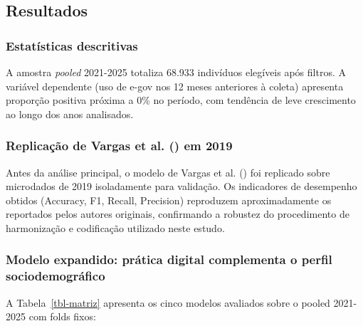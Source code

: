 \documentclass[
  man,
  floatsintext,
  longtable,
  a4paper,
  nolmodern,
  notxfonts,
  notimes,
  colorlinks=true,linkcolor=blue,citecolor=blue,urlcolor=blue]{apa7}
\begin{document}
\subsection{Resultados}\label{resultados}

\subsubsection{Estatísticas
descritivas}\label{estatuxedsticas-descritivas}

A amostra \emph{pooled} 2021-2025 totaliza 68.933 indivíduos elegíveis
após filtros. A variável dependente (uso de e-gov nos 12 meses
anteriores à coleta) apresenta proporção positiva próxima a 0\% no
período, com tendência de leve crescimento ao longo dos anos analisados.

\subsubsection{\texorpdfstring{Replicação de Vargas et al.
() em
2019}{Replicação de Vargas et al. (2021) em 2019}}\label{replicauxe7uxe3o-de-vargas2021-em-2019}

Antes da análise principal, o modelo de Vargas et al.
() foi replicado sobre microdados de 2019
isoladamente para validação. Os indicadores de desempenho obtidos
(Accuracy, F1, Recall, Precision) reproduzem aproximadamente os
reportados pelos autores originais, confirmando a robustez do
procedimento de harmonização e codificação utilizado neste estudo.

\subsubsection{Modelo expandido: prática digital complementa o perfil
sociodemográfico}\label{modelo-expandido-pruxe1tica-digital-complementa-o-perfil-sociodemogruxe1fico}

A Tabela~\ref{tbl-matriz} apresenta os cinco modelos avaliados sobre o
pooled 2021-2025 com folds fixos:
\end{document}

